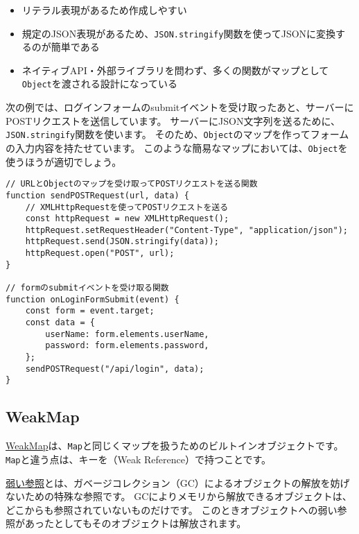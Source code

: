 \begin{itemize}
\item
  リテラル表現があるため作成しやすい
\item
  規定のJSON表現があるため、\texttt{JSON.stringify}関数を使ってJSONに変換するのが簡単である
\item
  ネイティブAPI・外部ライブラリを問わず、多くの関数がマップとして\texttt{Object}を渡される設計になっている
\end{itemize}

次の例では、ログインフォームのsubmitイベントを受け取ったあと、サーバーにPOSTリクエストを送信しています。
サーバーにJSON文字列を送るために、\texttt{JSON.stringify}関数を使います。
そのため、\texttt{Object}のマップを作ってフォームの入力内容を持たせています。
このような簡易なマップにおいては、\texttt{Object}を使うほうが適切でしょう。

\begin{lstlisting}
// URLとObjectのマップを受け取ってPOSTリクエストを送る関数
function sendPOSTRequest(url, data) {
    // XMLHttpRequestを使ってPOSTリクエストを送る
    const httpRequest = new XMLHttpRequest();
    httpRequest.setRequestHeader("Content-Type", "application/json");
    httpRequest.send(JSON.stringify(data));
    httpRequest.open("POST", url);
}

// formのsubmitイベントを受け取る関数
function onLoginFormSubmit(event) {
    const form = event.target;
    const data = {
        userName: form.elements.userName,
        password: form.elements.password,
    };
    sendPOSTRequest("/api/login", data);
}
\end{lstlisting}

\hypertarget{weakmap}{%
\subsection{WeakMap}\label{weakmap}}

\href{https://developer.mozilla.org/ja/docs/Web/JavaScript/Reference/Global_Objects/WeakMap}{WeakMap}は、\texttt{Map}と同じくマップを扱うためのビルトインオブジェクトです。
\texttt{Map}と違う点は、キーを\textbf{}（Weak
Reference）で持つことです。

\href{https://ja.wikipedia.org/wiki/\%E5\%BC\%B1\%E3\%81\%84\%E5\%8F\%82\%E7\%85\%A7}{弱い参照}とは、ガベージコレクション（GC）によるオブジェクトの解放を妨げないための特殊な参照です。
GCによりメモリから解放できるオブジェクトは、どこからも参照されていないものだけです。
このときオブジェクトへの弱い参照があったとしてもそのオブジェクトは解放されます。

